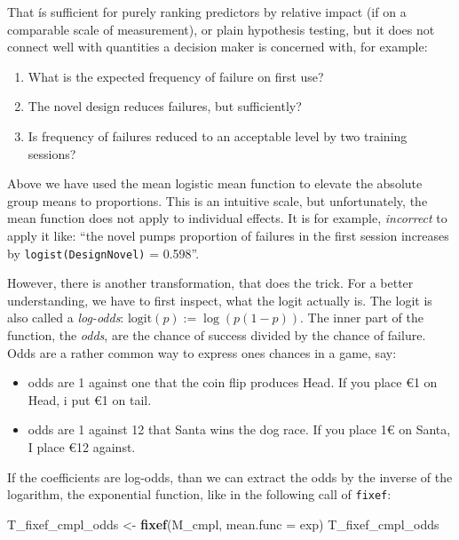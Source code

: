 \documentclass[]{svmono}
\newcommand{\euro}{€}
\newenvironment{Shaded}{\begin{snugshade}}{\end{snugshade}}
\newcommand{\KeywordTok}[1]{\textcolor[rgb]{0.13,0.29,0.53}{\textbf{#1}}}
\newcommand{\DataTypeTok}[1]{\textcolor[rgb]{0.13,0.29,0.53}{#1}}
\newcommand{\StringTok}[1]{\textcolor[rgb]{0.31,0.60,0.02}{#1}}
\newcommand{\NormalTok}[1]{#1}
\providecommand{\tightlist}{%
  \setlength{\itemsep}{0pt}\setlength{\parskip}{0pt}}
\theoremstyle{definition}
\theoremstyle{definition}
\theoremstyle{definition}
\theoremstyle{remark}
\begin{document}
That ís sufficient for purely ranking predictors by relative impact (if
on a comparable scale of measurement), or plain hypothesis testing, but
it does not connect well with quantities a decision maker is concerned
with, for example:

\begin{enumerate}
\def\labelenumi{\arabic{enumi}.}
\tightlist
\item
  What is the expected frequency of failure on first use?
\item
  The novel design reduces failures, but sufficiently?
\item
  Is frequency of failures reduced to an acceptable level by two
  training sessions?
\end{enumerate}

Above we have used the mean logistic mean function to elevate the
absolute group means to proportions. This is an intuitive scale, but
unfortunately, the mean function does not apply to individual effects.
It is for example, \emph{incorrect} to apply it like: ``the novel pumps
proportion of failures in the first session increases by
\texttt{logist(DesignNovel)} = 0.598''.

However, there is another transformation, that does the trick. For a
better understanding, we have to first inspect, what the logit actually
is. The logit is also called a \emph{log-odds}:
\(\textrm{logit}(p) := \log(p(1-p))\). The inner part of the function,
the \emph{odds}, are the chance of success divided by the chance of
failure. Odds are a rather common way to express ones chances in a game,
say:

\begin{itemize}
\tightlist
\item
  odds are 1 against one that the coin flip produces Head. If you place
  \euro{}1 on Head, i put \euro{}1 on tail.
\item
  odds are 1 against 12 that Santa wins the dog race. If you place
  1\euro{} on Santa, I place \euro{}12 against.
\end{itemize}

If the coefficients are log-odds, than we can extract the odds by the
inverse of the logarithm, the exponential function, like in the
following call of \texttt{fixef}:

\begin{Shaded}
\begin{Highlighting}[]
\NormalTok{T_fixef_cmpl_odds <-}\StringTok{ }\KeywordTok{fixef}\NormalTok{(M_cmpl, }\DataTypeTok{mean.func =}\NormalTok{ exp)}
\NormalTok{T_fixef_cmpl_odds}
\end{Highlighting}
\end{Shaded}
\end{document}
